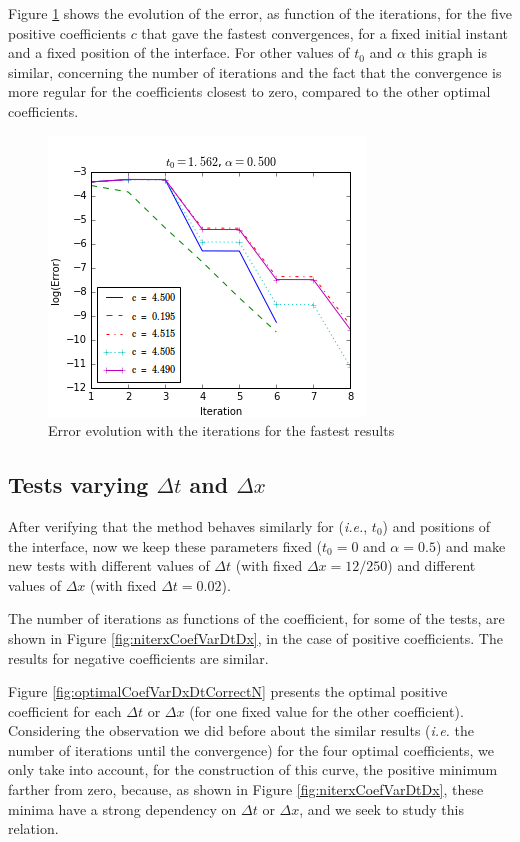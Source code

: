 \indent Figure \ref{fig:errorEvolution} shows the evolution of the error, as function of the iterations, for the five positive coefficients $c$ that gave the fastest convergences, for a fixed initial instant and a fixed position of the interface. For other values of $t_0$ and $\alpha$ this graph is similar, concerning the number of iterations and the fact that the convergence is more regular for the coefficients closest to zero, compared to the other optimal coefficients.

\begin{figure}[!h]
\centering
\includegraphics[scale=.5]{Fig4.png}
\caption{Error evolution with the iterations for the fastest results \label{fig:errorEvolution}}
\end{figure}

\subsection{Tests varying $\Delta t$ and $\Delta x$}

\indent After verifying that the method behaves similarly for  (\emph{i.e.},  $t_0$) and  positions of the interface, now we keep these parameters fixed ($t_0 = 0$ and $\alpha = 0.5$) and make new tests with different values of $\Delta t$ (with fixed $\Delta x = 12/250$) and different values of $\Delta x$ (with fixed $\Delta t = 0.02$).

\indent The number of iterations as functions of the coefficient, for some of the tests, are shown in Figure \ref{fig:niterxCoefVarDtDx}, in the case of positive coefficients. The results for negative coefficients are similar.

\indent Figure \ref{fig:optimalCoefVarDxDtCorrectN} presents the optimal positive coefficient for each $\Delta t$ or $\Delta x$ (for one fixed value for the other coefficient). Considering the observation we did before about the similar results (\emph{i.e.} the number of iterations until the convergence) for the four optimal coefficients, we only take into account, for the construction of this curve, the positive minimum farther from zero, because, as shown in Figure \ref{fig:niterxCoefVarDtDx}, these minima have a strong dependency on $\Delta t$ or $\Delta x$, and we seek to study this relation.

